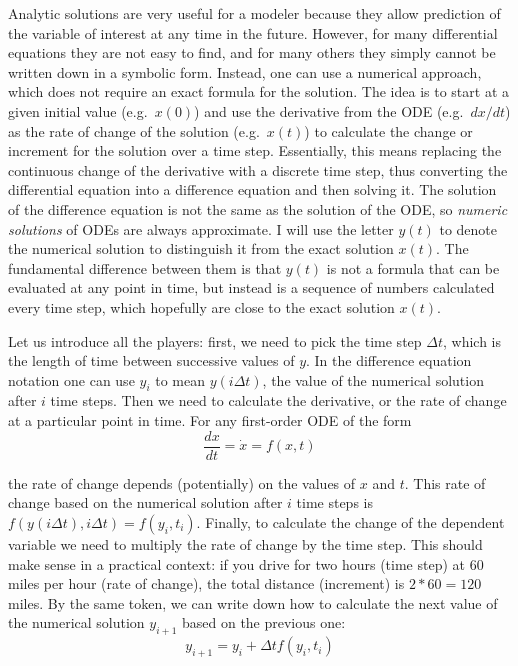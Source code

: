 \documentclass[
  letterpaper,
  DIV=11,
  numbers=noendperiod]{scrreprt}
\begin{document}
Analytic solutions are very useful for a modeler because they allow
prediction of the variable of interest at any time in the future.
However, for many differential equations they are not easy to find, and
for many others they simply cannot be written down in a symbolic form.
Instead, one can use a numerical approach, which does not require an
exact formula for the solution. The idea is to start at a given initial
value (e.g.~\(x(0)\)) and use the derivative from the ODE
(e.g.~\(dx/dt\)) as the rate of change of the solution (e.g.~\(x(t)\))
to calculate the change or increment for the solution over a time step.
Essentially, this means replacing the continuous change of the
derivative with a discrete time step, thus converting the differential
equation into a difference equation and then solving it. The solution of
the difference equation is not the same as the solution of the ODE, so
 \emph{numeric
solutions} of ODEs are always approximate. I will use the letter
\(y(t)\) to denote the numerical solution to distinguish it from the
exact solution \(x(t)\). The fundamental difference between them is that
\(y(t)\) is not a formula that can be evaluated at any point in time,
but instead is a sequence of numbers calculated every time step, which
hopefully are close to the exact solution \(x(t)\).

Let us introduce all the players: first, we need to pick the time step
\(\Delta t\), which is the length of time between successive values of
\(y\). In the difference equation notation one can use \(y_i\) to mean
\(y(i\Delta t)\), the value of the numerical solution after \(i\) time
steps. Then we need to calculate the derivative, or the rate of change
at a particular point in time. For any first-order ODE of the form
\[ \frac{d x} {dt} = \dot x = f(x,t)\]

the rate of change depends (potentially) on the values of \(x\) and
\(t\). This rate of change based on the numerical solution after \(i\)
time steps is \(f(y(i\Delta t), i\Delta t) = f(y_i, t_i)\). Finally, to
calculate the change of the dependent variable we need to multiply the
rate of change by the time step. This should make sense in a practical
context: if you drive for two hours (time step) at 60 miles per hour
(rate of change), the total distance (increment) is \(2*60=120\) miles.
By the same token, we can write down how to calculate the next value of
the numerical solution \(y_{i+1}\) based on the previous one:
\begin{equation}
 y_{i+1} = y_i + \Delta t f(y_i, t_i) 
 \label{eq:ch15_FE}
\end{equation}
\end{document}
